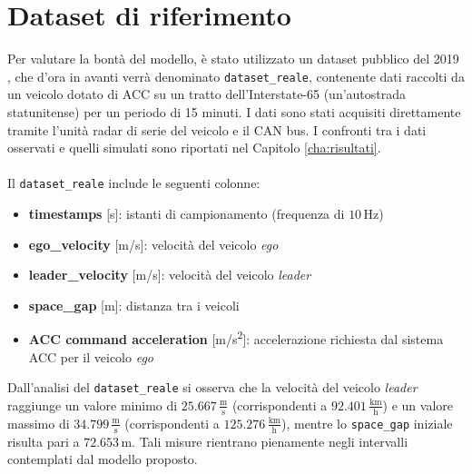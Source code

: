 \section{Dataset di riferimento}
Per valutare la bontà del modello, è stato utilizzato un dataset pubblico del 2019 \cite{wang2019acc_dataset}, che d'ora in avanti
verrà denominato \texttt{dataset\_reale}, contenente dati raccolti da un veicolo dotato di ACC su un tratto dell'Interstate-65 
(un'autostrada statunitense) per un periodo di 15 minuti.  
I dati sono stati acquisiti direttamente tramite l'unità radar di serie del veicolo e il CAN bus.  
I confronti tra i dati osservati e quelli simulati sono riportati nel Capitolo \ref{cha:risultati}.
\\\\
\noindent Il \texttt{dataset\_reale} include le seguenti colonne:
\begin{itemize}
    \item \textbf{timestamps} [s]: istanti di campionamento (frequenza di $10\,\mathrm{Hz}$)
    \item \textbf{ego\_velocity} [m/s]: velocità del veicolo \emph{ego}
    \item \textbf{leader\_velocity} [m/s]: velocità del veicolo \emph{leader}
    \item \textbf{space\_gap} [m]: distanza tra i veicoli
    \item \textbf{ACC command acceleration} [m/s\textsuperscript{2}]: accelerazione richiesta dal sistema ACC per il veicolo \emph{ego}
\end{itemize}

\noindent Dall'analisi del \texttt{dataset\_reale} si osserva che la velocità del veicolo \emph{leader} 
raggiunge un valore minimo di $25.667 \, \frac{\mathrm{m}}{\mathrm{s}}$ 
(corrispondenti a $92.401 \, \frac{\mathrm{km}}{\mathrm{h}}$) e un valore massimo di 
$34.799 \, \frac{\mathrm{m}}{\mathrm{s}}$ (corrispondenti a $125.276 \, \frac{\mathrm{km}}{\mathrm{h}}$), 
mentre lo \texttt{space\_gap} iniziale risulta pari a $72.653 \, \mathrm{m}$.  
Tali misure rientrano pienamente negli intervalli contemplati dal modello proposto.

